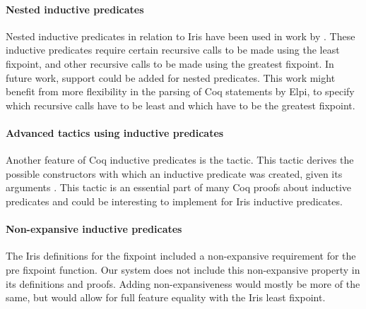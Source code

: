 \documentclass[thesis.tex]{subfiles}
\begin{document}
\paragraph{Nested inductive predicates}
Nested inductive predicates in relation to Iris have been used in work by  \cite{gaherSimulirisSeparationLogic2022}. These inductive predicates require certain recursive calls to be made using the least fixpoint, and other recursive calls to be made using the greatest fixpoint. In future work, support could be added for nested predicates. This work might benefit from more flexibility in the parsing of  Coq statements by Elpi, to specify which recursive calls have to be least and which have to be the greatest fixpoint.

\paragraph{Advanced tactics using inductive predicates}
Another feature of Coq inductive predicates is the  tactic. This tactic derives the possible constructors with which an inductive predicate was created, given its arguments \cite{cornesAutomatingInversionInductive1996}. This tactic is an essential part of many Coq proofs about inductive predicates and could be interesting to implement for Iris inductive predicates.

\paragraph{Non-expansive inductive predicates}
The Iris definitions for the fixpoint included a non-expansive requirement for the pre fixpoint function. Our system does not include this non-expansive property in its definitions and proofs. Adding non-expansiveness would mostly be more of the same, but would allow for full feature equality with the Iris least fixpoint.
\end{document}
